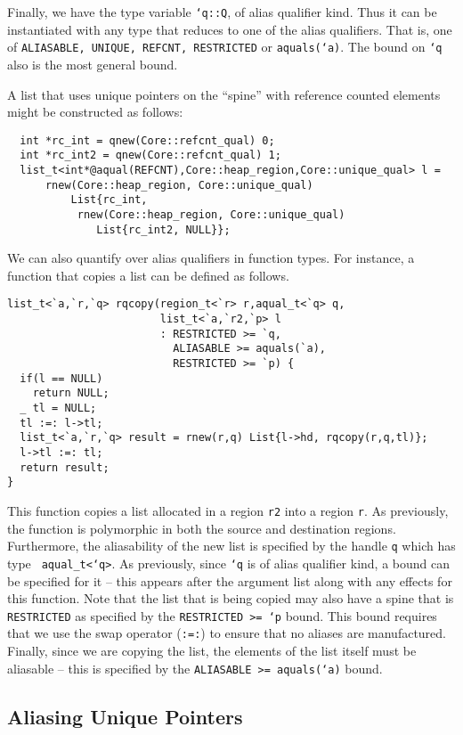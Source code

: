 Finally, we have the type variable {\tt `q::Q}, of alias qualifier
kind. Thus it can be instantiated with any type that reduces to one of
the alias qualifiers. That is, one of {\tt ALIASABLE, UNIQUE, REFCNT,
RESTRICTED} or {\tt aquals(`a)}. The bound on {\tt `q} also is the
most general bound.

A list that uses unique pointers on the ``spine'' with reference
counted elements might be constructed as follows:

\begin{verbatim}
  int *rc_int = qnew(Core::refcnt_qual) 0;
  int *rc_int2 = qnew(Core::refcnt_qual) 1;
  list_t<int*@aqual(REFCNT),Core::heap_region,Core::unique_qual> l =
      rnew(Core::heap_region, Core::unique_qual) 
          List{rc_int, 
	       rnew(Core::heap_region, Core::unique_qual) 
	          List{rc_int2, NULL}};
\end{verbatim}

We can also quantify over alias qualifiers in function types. For
instance, a function that copies a list can be defined as follows.

\begin{verbatim}
list_t<`a,`r,`q> rqcopy(region_t<`r> r,aqual_t<`q> q,
                        list_t<`a,`r2,`p> l
                        : RESTRICTED >= `q,
                          ALIASABLE >= aquals(`a),
                          RESTRICTED >= `p) {
  if(l == NULL)
    return NULL;
  _ tl = NULL;
  tl :=: l->tl;
  list_t<`a,`r,`q> result = rnew(r,q) List{l->hd, rqcopy(r,q,tl)};
  l->tl :=: tl;
  return result;
}
\end{verbatim}

This function copies a list allocated in a region {\tt r2} into a
region {\tt r}. As previously, the function is polymorphic in both the
source and destination regions. Furthermore, the aliasability of the
new list is specified by the handle {\tt q} which has type {\tt
aqual\_t<`q>}. As previously, since {\tt `q} is of alias qualifier
kind, a bound can be specified for it -- this appears after the
argument list along with any effects for this function. Note that the
list that is being copied may also have a spine that is {\tt
RESTRICTED} as specified by the {\tt RESTRICTED >= `p} bound. This
bound requires that we use the swap operator ({\tt :=:}) to ensure
that no aliases are manufactured. Finally, since we are copying the
list, the elements of the list itself must be aliasable -- this is
specified by the {\tt ALIASABLE >= aquals(`a)} bound.

\subsection{Aliasing Unique Pointers}
\label{sec:alias}

